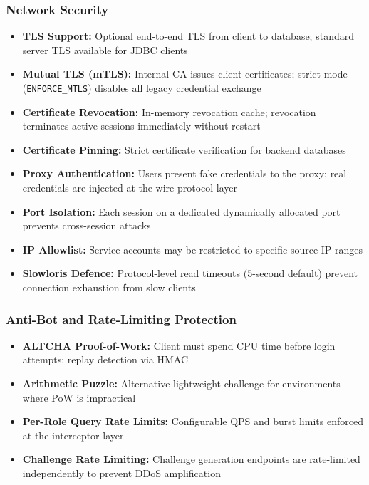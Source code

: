 \subsubsection{Network Security}

\begin{itemize}[leftmargin=*]
    \item \textbf{TLS Support:} Optional end-to-end TLS from client to database; standard server TLS available for JDBC clients
    \item \textbf{Mutual TLS (mTLS):} Internal CA issues client certificates; strict mode (\texttt{ENFORCE\_MTLS}) disables all legacy credential exchange
    \item \textbf{Certificate Revocation:} In-memory revocation cache; revocation terminates active sessions immediately without restart
    \item \textbf{Certificate Pinning:} Strict certificate verification for backend databases
    \item \textbf{Proxy Authentication:} Users present fake credentials to the proxy; real credentials are injected at the wire-protocol layer
    \item \textbf{Port Isolation:} Each session on a dedicated dynamically allocated port prevents cross-session attacks
    \item \textbf{IP Allowlist:} Service accounts may be restricted to specific source IP ranges
    \item \textbf{Slowloris Defence:} Protocol-level read timeouts (5-second default) prevent connection exhaustion from slow clients
\end{itemize}

\subsubsection{Anti-Bot and Rate-Limiting Protection}

\begin{itemize}[leftmargin=*]
    \item \textbf{ALTCHA Proof-of-Work:} Client must spend CPU time before login attempts; replay detection via HMAC
    \item \textbf{Arithmetic Puzzle:} Alternative lightweight challenge for environments where PoW is impractical
    \item \textbf{Per-Role Query Rate Limits:} Configurable QPS and burst limits enforced at the interceptor layer
    \item \textbf{Challenge Rate Limiting:} Challenge generation endpoints are rate-limited independently to prevent DDoS amplification
\end{itemize}

